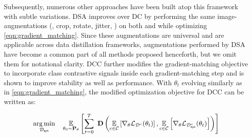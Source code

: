 \documentclass[10pt]{article} %
\begin{document}
Subsequently, numerous other approaches have been built atop this framework with subtle variations. DSA \citep{zhao_dsa} improves over DC by performing the same image-augmentations (\eg, crop, rotate, jitter, \etc) on both \dataset and \distill while optimizing \cref{eqn:gradient_matching}. Since these augmentations are universal and are applicable across data distillation frameworks, augmentations performed by DSA have become a common part of all methods proposed henceforth, but we omit them for notational clarity. DCC \citep{dcc} further modifies the gradient-matching objective to incorporate class contrastive signals inside each gradient-matching step and is shown to improve stability as well as performance. With $\theta_t$ evolving similarly as in \cref{eqn:gradient_matching}, the modified optimization objective for DCC can be written as:

\begin{equation} \label{eqn:dcc_gradient_matching}
\begin{gathered}
    \underset{\mathcal{D}_{\mathsf{syn}}}{\operatorname{arg} \operatorname{min}} \hspace{0.4cm} \underset{\theta_0 \sim \mathbf{P}_\theta}{\mathbb{E}} \left[\sum_{t=0}^T ~ \mathbf{D}\left( \underset{c \in \mathcal{C}}{\mathbb{E}} \left[ \nabla_\theta \mathcal{L}_{\mathcal{D}^c}(\theta_t)\right], \underset{c \in \mathcal{C}}{\mathbb{E}} \left[\nabla_\theta \mathcal{L}_{\mathcal{D}_{\mathsf{syn}}^c}(\theta_t)\right] \right)\right]
\end{gathered}
\end{equation}
\end{document}
